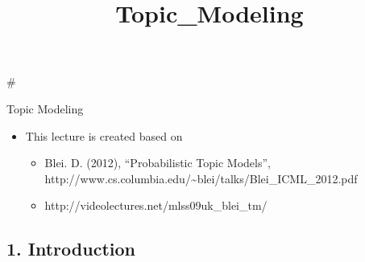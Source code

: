 \documentclass[11pt]{article}
\title{Topic\_Modeling}
\providecommand{\tightlist}{%
      \setlength{\itemsep}{0pt}\setlength{\parskip}{0pt}}
\begin{document}
    
    
    \maketitle
    
    

    
    \#

Topic Modeling

\begin{itemize}
\tightlist
\item
  This lecture is created based on

  \begin{itemize}
  \tightlist
  \item
    Blei. D. (2012), ``Probabilistic Topic Models'',
    http://www.cs.columbia.edu/\textasciitilde{}blei/talks/Blei\_ICML\_2012.pdf
  \item
    http://videolectures.net/mlss09uk\_blei\_tm/
  \end{itemize}
\end{itemize}

    \hypertarget{introduction}{%
\subsection{1. Introduction}\label{introduction}}
\end{document}
